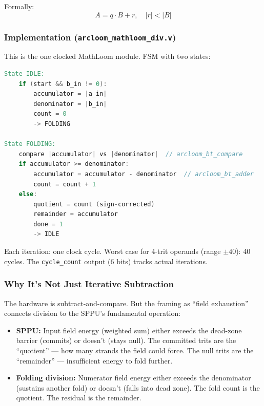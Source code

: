 \documentclass[11pt,a4paper]{article}
\begin{document}
Formally:
\begin{equation}
A = q \cdot B + r, \quad |r| < |B|
\end{equation}

\subsubsection{Implementation (\texttt{arcloom\_mathloom\_div.v})}

This is the one clocked MathLoom module. FSM with two states:

\begin{lstlisting}[language=Verilog]
State IDLE:
    if (start && b_in != 0):
        accumulator = |a_in|
        denominator = |b_in|
        count = 0
        -> FOLDING

State FOLDING:
    compare |accumulator| vs |denominator|  // arcloom_bt_compare
    if accumulator >= denominator:
        accumulator = accumulator - denominator  // arcloom_bt_adder
        count = count + 1
    else:
        quotient = count (sign-corrected)
        remainder = accumulator
        done = 1
        -> IDLE
\end{lstlisting}

Each iteration: one clock cycle. Worst case for 4-trit operands (range $\pm 40$): 40 cycles. The \texttt{cycle\_count} output (6 bits) tracks actual iterations.

\subsubsection{Why It's Not Just Iterative Subtraction}

The hardware is subtract-and-compare. But the framing as ``field exhaustion'' connects division to the SPPU's fundamental operation:

\begin{itemize}
    \item \textbf{SPPU:} Input field energy (weighted sum) either exceeds the dead-zone barrier (commits) or doesn't (stays null). The committed trits are the ``quotient'' --- how many strands the field could force. The null trits are the ``remainder'' --- insufficient energy to fold further.

    \item \textbf{Folding division:} Numerator field energy either exceeds the denominator (sustains another fold) or doesn't (falls into dead zone). The fold count is the quotient. The residual is the remainder.
\end{itemize}
\end{document}
